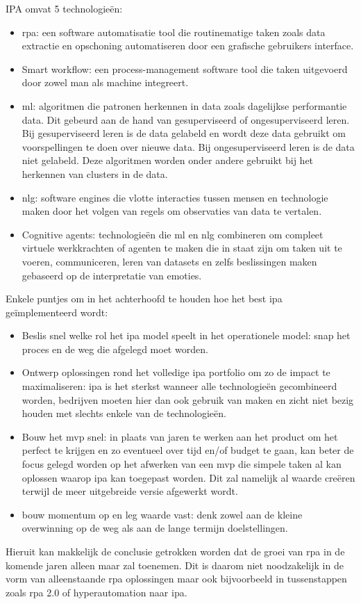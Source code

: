 IPA omvat 5 technologieën:
\begin{itemize}
	\item \acrshort{rpa}: een software automatisatie tool die routinematige taken zoals data extractie en opschoning automatiseren door een grafische gebruikers interface.
	\item Smart \gls{workflow}: een process-management software tool die taken uitgevoerd door zowel man als machine integreert.
	\item  \acrshort{ml}: algoritmen die patronen herkennen in data zoals dagelijkse performantie data. Dit gebeurd aan de hand van gesuperviseerd of ongesuperviseerd leren. Bij gesuperviseerd leren is de data gelabeld en wordt deze data gebruikt om voorspellingen te doen over nieuwe data. Bij ongesuperviseerd leren is de data niet gelabeld. Deze algoritmen worden onder andere gebruikt bij het herkennen van clusters in de data.
	\item  \acrshort{nlg}: software engines die vlotte interacties tussen mensen en technologie maken door het volgen van regels om observaties van data te vertalen.
	\item Cognitive agents: technologieën die  \acrshort{ml} en  \acrshort{nlg} combineren om compleet virtuele werkkrachten of agenten te maken die in staat zijn om taken uit te voeren, communiceren, leren van datasets en zelfs beslissingen maken gebaseerd op de interpretatie van emoties.
\end{itemize}

Enkele puntjes om in het achterhoofd te houden hoe het best  \acrshort{ipa} geïmplementeerd wordt:
\begin{itemize}
	\item Beslis snel welke rol het \acrshort{ipa} model speelt in het operationele model: snap het proces en de weg die afgelegd moet worden.
	\item Ontwerp oplossingen rond het volledige \acrshort{ipa} portfolio om zo de impact te maximaliseren: \acrshort{ipa} is het sterkst wanneer alle technologieën gecombineerd worden, bedrijven moeten hier dan ook gebruik van maken en zicht niet bezig houden met slechts enkele van de technologieën.
	\item Bouw het \acrfull{mvp} snel: in plaats van jaren te werken aan het product om het perfect te krijgen en zo eventueel over tijd en/of budget te gaan, kan beter de focus gelegd worden op het afwerken van een \acrshort{mvp} die simpele taken al kan oplossen waarop \acrshort{ipa} kan toegepast worden. Dit zal namelijk al waarde creëren terwijl de meer uitgebreide versie afgewerkt wordt.
	\item bouw momentum op en leg waarde vast: denk zowel aan de kleine overwinning op de weg als aan de  lange termijn doelstellingen.
\end{itemize} \autocite{everythingIPA}

Hieruit kan makkelijk de conclusie getrokken worden dat de groei van \acrshort{rpa} in de komende jaren alleen maar zal toenemen. Dit is daarom niet noodzakelijk in de vorm van alleenstaande \acrshort{rpa} oplossingen maar ook bijvoorbeeld in tussenstappen zoals \acrshort{rpa} 2.0 of hyperautomation naar \acrshort{ipa}.